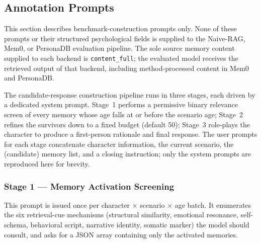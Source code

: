 \documentclass[11pt]{article}
\begin{document}
\subsection{Annotation Prompts}
\label{app:prompt_annotation}

This section describes benchmark-construction prompts only. None of these prompts or their structured psychological fields is supplied to the Naive-RAG, Mem0, or PersonaDB evaluation pipeline. The sole source memory content supplied to each backend is \texttt{content\_full}; the evaluated model receives the retrieved output of that backend, including method-processed content in Mem0 and PersonaDB.

The candidate-response construction pipeline runs in three stages, each driven by a dedicated system prompt. Stage~1 performs a permissive binary relevance screen of every memory whose age falls at or before the scenario age; Stage~2 refines the survivors down to a fixed budget (default 50); Stage~3 role-plays the character to produce a first-person rationale and final response. The user prompts for each stage concatenate character information, the current scenario, the (candidate) memory list, and a closing instruction; only the system prompts are reproduced here for brevity.

\subsubsection{Stage 1 --- Memory Activation Screening}
\label{app:prompt_activation}

This prompt is issued once per character $\times$ scenario $\times$ age batch. It enumerates the six retrieval-cue mechanisms (structural similarity, emotional resonance, self-schema, behavioral script, narrative identity, somatic marker) the model should consult, and asks for a JSON array containing only the activated memories.
\end{document}
